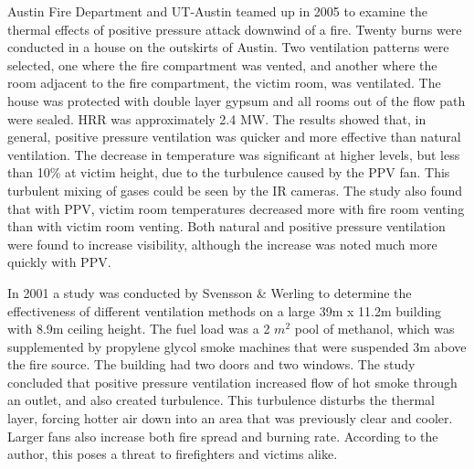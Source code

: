 \documentclass{article}
\begin{document}
Austin Fire Department and UT-Austin teamed up in 2005 to examine the thermal effects of positive pressure attack downwind of a fire. Twenty burns were conducted in a house on the outskirts of Austin. Two ventilation patterns were selected, one where the fire compartment was vented, and another where the room adjacent to the fire compartment, the victim room, was ventilated. The house was protected with double layer gypsum and all rooms out of the flow path were sealed. HRR was approximately 2.4 MW. The results showed that, in general, positive pressure ventilation was quicker and more effective than natural ventilation. The decrease in temperature was significant at higher levels, but less than 10\% at victim height, due to the turbulence caused by the PPV fan. This turbulent mixing of gases could be seen by the IR cameras. The study also found that with PPV, victim room temperatures decreased more with fire room venting than with victim room venting. Both natural and positive pressure ventilation were found to increase visibility, although the increase was noted much more quickly with PPV. \cite{Lakshmin}

In 2001 a study was conducted by Svensson \& Werling to determine the effectiveness of different ventilation methods on a large 39m x 11.2m building with 8.9m ceiling height. The fuel load was a 2 $m^{2}$ pool of methanol, which was supplemented by propylene glycol smoke machines that were suspended 3m above the fire source.  The building had two doors and two windows. The study concluded that positive pressure ventilation increased flow of hot smoke through an outlet, and also created turbulence. This turbulence disturbs the thermal layer, forcing hotter air down into an area that was previously clear and cooler. Larger fans also increase both fire spread and burning rate. According to the author, this poses a threat to firefighters and victims alike.\cite{SvenssonFireVentinLargeFireHall}
\end{document}
